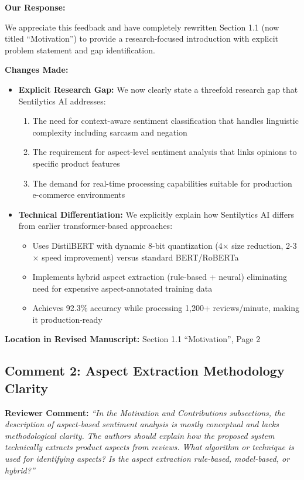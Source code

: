 \documentclass[11pt,a4paper]{article}
\begin{document}
\vspace{6pt}

\textbf{Our Response:}

We appreciate this feedback and have completely rewritten Section 1.1 (now titled ``Motivation'') to provide a research-focused introduction with explicit problem statement and gap identification.

\textbf{Changes Made:}
\begin{itemize}[leftmargin=*]
    \item \textbf{Explicit Research Gap:} We now clearly state a threefold research gap that Sentilytics AI addresses:
    \begin{enumerate}
        \item The need for context-aware sentiment classification that handles linguistic complexity including sarcasm and negation
        \item The requirement for aspect-level sentiment analysis that links opinions to specific product features
        \item The demand for real-time processing capabilities suitable for production e-commerce environments
    \end{enumerate}
    
    \item \textbf{Technical Differentiation:} We explicitly explain how Sentilytics AI differs from earlier transformer-based approaches:
    \begin{itemize}
        \item Uses DistilBERT with dynamic 8-bit quantization (4$\times$ size reduction, 2-3$\times$ speed improvement) versus standard BERT/RoBERTa
        \item Implements hybrid aspect extraction (rule-based + neural) eliminating need for expensive aspect-annotated training data
        \item Achieves 92.3\% accuracy while processing 1,200+ reviews/minute, making it production-ready
    \end{itemize}
\end{itemize}

\textbf{Location in Revised Manuscript:} Section 1.1 ``Motivation'', Page 2


\subsection*{Comment 2: Aspect Extraction Methodology Clarity}

\textbf{Reviewer Comment:} \textit{``In the Motivation and Contributions subsections, the description of aspect-based sentiment analysis is mostly conceptual and lacks methodological clarity. The authors should explain how the proposed system technically extracts product aspects from reviews. What algorithm or technique is used for identifying aspects? Is the aspect extraction rule-based, model-based, or hybrid?''}
\end{document}
